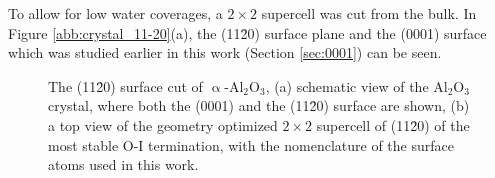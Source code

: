 \documentclass[11pt,DIV=13,BCOR=5mm,a4paper,headinclude]{scrbook}
\begin{document}
To allow for low water coverages, a $2\times 2$ supercell was cut from the bulk.
In Figure \ref{abb:crystal_11-20}(a), the (11\=20) surface plane and the (0001) surface which was studied earlier in this work (Section \ref{sec:0001}) can be seen.
\begin{figure}[!h]
    \centering
             \quad
             \quad
             \caption{The (11\=20) surface cut of $\upalpha$-Al$_2$O$_3$, (a) schematic view of the Al$_2$O$_3$ crystal, where both the (0001) and the (11\=20) surface are shown, (b) a top view of the geometry optimized $2\times 2$ supercell of (11\=20) of the most stable O-I termination, with the nomenclature of the surface atoms used in this work.
}
\end{figure}
\end{document}
